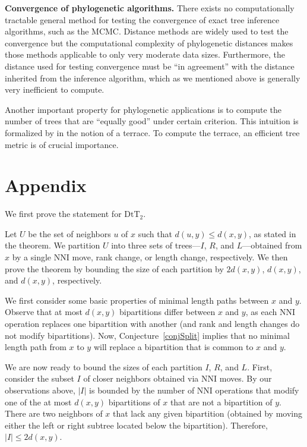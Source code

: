 \documentclass[11pt]{amsart}
\theoremstyle{definition}
\newcommand{\nni}{\mathrm{NNI}}
\newcommand{\dtt}{\mathrm{DtT}}
\begin{document}
\textbf{Convergence of phylogenetic algorithms.} There exists no computationally tractable general method for testing the convergence of exact tree inference algorithms, such as the MCMC.
Distance methods are widely used to test the convergence but the computational complexity of phylogenetic distances makes those methods applicable to only very moderate data sizes.
Furthermore, the distance used for testing convergence must be ``in agreement'' with the distance inherited from the inference algorithm, which as we mentioned above is generally very inefficient to compute.

Another important property for phylogenetic applications is to compute the number of trees that are ``equally good'' under certain criterion.
This intuition is formalized by \textcite{Sanderson2011-zp} in the notion of a terrace.
To compute the terrace, an efficient tree metric is of crucial importance.

\newpage


\section{Appendix}
\label{secAppendix}

We first prove the statement for $\dtt_2$.

Let $U$ be the set of neighbors $u$ of $x$ such that $d(u,y) \le d(x,y)$, as stated in the theorem.
We partition $U$ into three sets of trees---$I$, $R$, and $L$---obtained from $x$ by a single $\nni$ move, rank change, or length change, respectively.
We then prove the theorem by bounding the size of each partition by $2d(x,y)$, $d(x,y)$, and $d(x,y)$, respectively.

We first consider some basic properties of minimal length paths between $x$ and $y$.
Observe that at most $d(x,y)$ bipartitions differ between $x$ and $y$, as each $\nni$ operation replaces one bipartition with another (and rank and length changes do not modify bipartitions).
Now, Conjecture~\ref{conjSplit} implies that no minimal length path from $x$ to $y$ will replace a bipartition that is common to $x$ and $y$.

We are now ready to bound the sizes of each partition $I$, $R$, and $L$.
First, consider the subset $I$ of closer neighbors obtained via $\nni$ moves.
By our observations above, $|I|$ is bounded by the number of $\nni$ operations that modify one of the at most $d(x,y)$ bipartitions of $x$ that are not a bipartition of $y$.
There are two neighbors of $x$ that lack any given bipartition (obtained by moving either the left or right subtree located below the bipartition).
Therefore, $|I| \le 2d(x,y)$.
\end{document}
